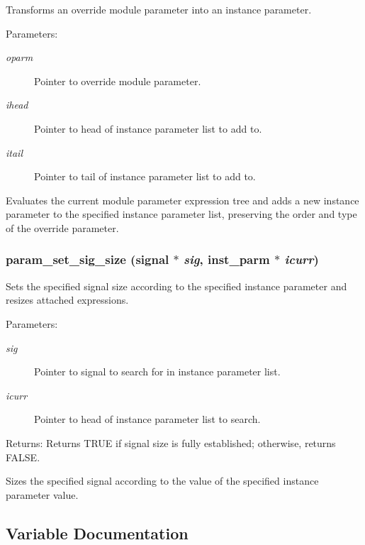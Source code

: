 Transforms an override module parameter into an instance parameter. 

\begin{Desc}
\item[Parameters:]
\begin{description}
\item[{\em oparm}]Pointer to override module parameter. \item[{\em ihead}]Pointer to head of instance parameter list to add to. \item[{\em itail}]Pointer to tail of instance parameter list to add to.\end{description}
\end{Desc}
Evaluates the current module parameter expression tree and adds a new instance parameter to the specified instance parameter list, preserving the order and type of the override parameter. 
\subsubsection{ param\_\-set\_\-sig\_\-size ({\bf signal} $\ast$ {\em sig}, {\bf inst\_\-parm} $\ast$ {\em icurr})}\label{param_8c_a13}


Sets the specified signal size according to the specified instance parameter and resizes attached expressions. 

\begin{Desc}
\item[Parameters:]
\begin{description}
\item[{\em sig}]Pointer to signal to search for in instance parameter list. \item[{\em icurr}]Pointer to head of instance parameter list to search.\end{description}
\end{Desc}
\begin{Desc}
\item[Returns:]Returns TRUE if signal size is fully established; otherwise, returns FALSE.\end{Desc}
Sizes the specified signal according to the value of the specified instance parameter value. 

\subsection{Variable Documentation}
